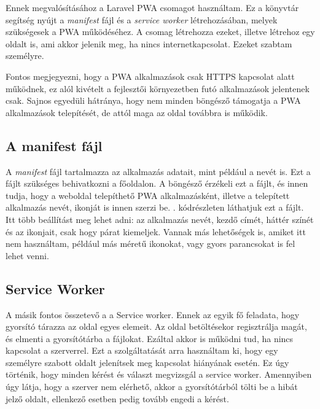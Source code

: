 \documentclass[
]{thesis-ekf}
\theoremstyle{definition}
\theoremstyle{remark}
\begin{document}
Ennek megvalósításához a Laravel PWA\cite{laravelpwa} csomagot használtam. Ez a könyvtár segítség nyújt a \emph{manifest} fájl és a \emph{service worker} létrehozásában, melyek szükségesek a PWA működéséhez. A csomag létrehozza ezeket, illetve létrehoz egy oldalt is, ami akkor jelenik meg, ha nincs internetkapcsolat. Ezeket szabtam személyre.

Fontos megjegyezni, hogy a PWA alkalmazások csak HTTPS kapcsolat alatt működnek, ez alól kivételt a fejlesztői környezetben futó alkalmazások jelentenek csak. Sajnos egyedüli hátránya, hogy nem minden böngésző támogatja a PWA alkalmazások telepítését, de attól maga az oldal továbbra is működik.

\subsection{A manifest fájl}

A \emph{manifest} fájl tartalmazza az alkalmazás adatait, mint például a nevét is. Ezt a fájlt szükséges behivatkozni a főoldalon. A böngésző érzékeli ezt a fájlt, és innen tudja, hogy a weboldal telepíthető PWA alkalmazásként, illetve a telepített alkalmazás nevét, ikonját is innen szerzi be. . kódrészleten láthatjuk ezt a fájlt. Itt több beállítást meg lehet adni: az alkalmazás nevét, kezdő címét, háttér színét és az ikonjait, csak hogy párat kiemeljek. Vannak más lehetőségek is, amiket itt nem használtam, például más méretű ikonokat, vagy gyors parancsokat is fel lehet venni.



\subsection{Service Worker}

A másik fontos összetevő a a Service worker. Ennek az egyik fő feladata, hogy gyorsító tárazza az oldal egyes elemeit. Az oldal betöltésekor regisztrálja magát, és elmenti a gyorsítótárba a fájlokat. Ezáltal akkor is működni tud, ha nincs kapcsolat a szerverrel. Ezt a szolgáltatását arra használtam ki, hogy egy személyre szabott oldalt jelenítsek meg kapcsolat hiányának esetén. Ez úgy történik, hogy minden kérést és választ megvizsgál a service worker. Amennyiben úgy látja, hogy a szerver nem elérhető, akkor a gyorsítótárból tölti be a hibát jelző oldalt, ellenkező esetben pedig tovább engedi a kérést. 
\end{document}
